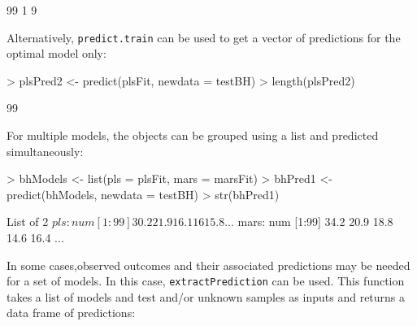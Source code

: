 \documentclass[12pt]{article}
\begin{document}
\begin{small}
\begin{Schunk}
\begin{Soutput}
[1] 99  1  9
\end{Soutput}
\end{Schunk}
\end{small}
Alternatively, \texttt{predict.train} can be used to get a vector of predictions for the optimal model only:
\begin{small}
\begin{Schunk}
\begin{Sinput}
> plsPred2 <- predict(plsFit, newdata = testBH)
> length(plsPred2)
\end{Sinput}
\begin{Soutput}
[1] 99
\end{Soutput}
\end{Schunk}
\end{small}
For multiple models, the objects can be grouped using a list and predicted simultaneously:
\begin{small}
\begin{Schunk}
\begin{Sinput}
> bhModels <- list(pls = plsFit, mars = marsFit)
> bhPred1 <- predict(bhModels, newdata = testBH)
> str(bhPred1)
\end{Sinput}
\begin{Soutput}
List of 2
 $ pls : num [1:99] 30.2 21.9 16.1 16 15.8 ...
 $ mars: num [1:99] 34.2 20.9 18.8 14.6 16.4 ...
\end{Soutput}
\end{Schunk}
\end{small}
In some cases,observed outcomes and their associated predictions may be needed for a set of models. In this case, \texttt{extractPrediction} can be used. This function takes a list of models and test and/or unknown samples as inputs and returns a data frame of predictions:
\end{document}

